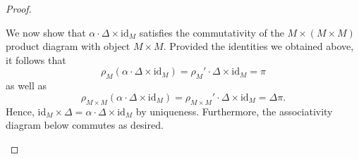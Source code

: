 \documentclass[ 12pt ]{article}
\begin{document}
\begin{enumerate}
\begin{proof}
\begin{center}
\begin{tikzcd}
			\end{tikzcd}
			\end{center}
			We now show that $\alpha \cdot \Delta \times \mathrm{id}_M$ satisfies the commutativity of the $M \times (M \times M)$ product diagram with object $M \times M$. Provided the identities we obtained above, it follows that $$\rho_M (\alpha \cdot \Delta \times \mathrm{id}_M) = \rho_M' \cdot \Delta \times \mathrm{id}_M = \pi$$ as well as $$\rho_{M \times M} (\alpha \cdot \Delta \times \mathrm{id}_M) = \rho_{M \times M}' \cdot \Delta \times \mathrm{id}_M = \Delta \pi.$$ Hence, $\mathrm{id}_M \times \Delta = \alpha \cdot \Delta \times \mathrm{id}_M$ by uniqueness. Furthermore, the associativity diagram below commutes as desired.
			\begin{center}
			\end{center}
			$ $ \\


\end{proof}
\end{enumerate}
\end{document}
